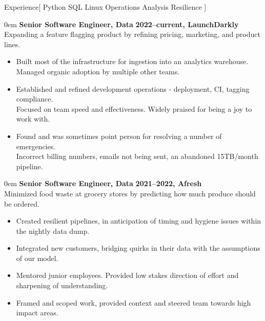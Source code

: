 \documentclass[11pt,a4paper]{article}
\newenvironment{worksection}[3]{
    \begin{addmargin}[0.5em]{0em}
    {\large\bfseries #1} \hfill {\bfseries #2}\\%
    \hspace*{0ex}#3
    \begin{itemize}
        [label=-, topsep=0pt, itemsep=0.5ex, parsep=0pt, leftmargin=1em]
}{
    \end{itemize}
    \end{addmargin}
    \medskip
}
\begin{document}
\sloppy  %


\vspace{1em}

\begin{mysection}{Experience}[
    Python
    \textbullet{} SQL
    \textbullet{} Linux
    \textbullet{} Operations
    \textbullet{} Analysis
    \textbullet{} Resilience
]

  \begin{worksection}
        {Senior Software Engineer, Data}
        {2022--current, LaunchDarkly}
        {Expanding a feature flagging product by refining pricing, marketing,
         and product lines.}

    \item Built most of the infrastructure for ingestion into an analytics
          warehouse.
    \\    Managed organic adoption by multiple other teams.

    \item Established and refined development operations - deployment, CI,
          tagging compliance.
    \\    Focused on team speed and effectiveness.
          Widely praised for being a joy to work with.

    \item Found and was sometimes point person for resolving a number of
          emergencies.
    \\    Incorrect billing numbers, emails not being sent,
          an abandoned 15TB/month pipeline.

  \end{worksection}

  \begin{worksection}
        {Senior Software Engineer, Data}
        {2021--2022, Afresh}
        {Minimized food waste at grocery stores by predicting how much produce
         should be ordered.}

    \item Created resilient pipelines, in anticipation of timing and hygiene
          issues within the nightly data dump.
    \item Integrated new customers, bridging quirks in their data with the
          assumptions of our model.
    \item Mentored junior employees.  Provided low stakes direction of effort
          and sharpening of understanding.
    \item Framed and scoped work, provided context and steered team towards
          high impact areas.


\end{worksection}
\end{mysection}
\end{document}
